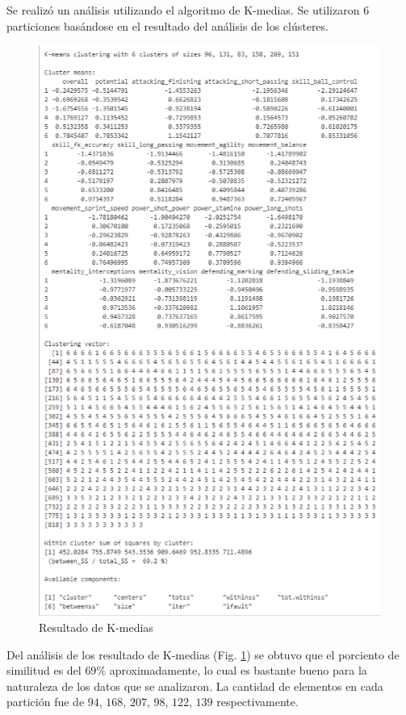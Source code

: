 \documentclass[a4paper,10pt,twocolumn]{article}
\begin{document}
Se realizó un análisis utilizando el algoritmo de K-medias. Se utilizaron $6$ particiones basándose en el resultado del análisis de los clústeres.

\begin{figure}[htb]%
	\begin{center}
		\includegraphics[width=\linewidth]{kmeans}
	\end{center}
	\caption{Resultado de K-medias \label{fig:kmeans}}%
\end{figure}

Del análisis de los resultado de K-medias (Fig. \ref{fig:kmeans}) se obtuvo que el porciento de similitud es del $69\%$ aproximadamente, lo cual es bastante bueno para la naturaleza de los datos que se analizaron. La cantidad de elementos en cada partición fue de $94$, $168$, $207$, $98$, $122$, $139$ respectivamente.
\end{document}
